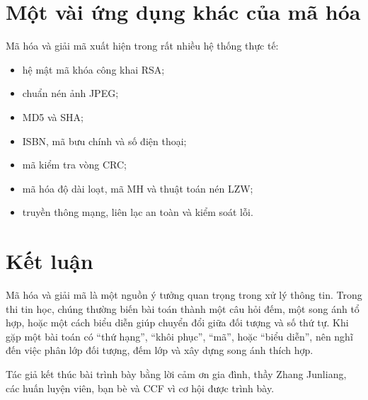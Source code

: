 \documentclass[11pt]{article}
\begin{document}
\section{Một vài ứng dụng khác của mã hóa}

Mã hóa và giải mã xuất hiện trong rất nhiều hệ thống thực tế:
\begin{itemize}
  \item hệ mật mã khóa công khai RSA;
  \item chuẩn nén ảnh JPEG;
  \item MD5 và SHA;
  \item ISBN, mã bưu chính và số điện thoại;
  \item mã kiểm tra vòng CRC;
  \item mã hóa độ dài loạt, mã MH và thuật toán nén LZW;
  \item truyền thông mạng, liên lạc an toàn và kiểm soát lỗi.
\end{itemize}

\section{Kết luận}

Mã hóa và giải mã là một nguồn ý tưởng quan trọng trong xử lý thông tin.
Trong thi tin học, chúng thường biến bài toán thành một câu hỏi đếm, một
song ánh tổ hợp, hoặc một cách biểu diễn giúp chuyển đổi giữa đối tượng và
số thứ tự. Khi gặp một bài toán có ``thứ hạng'', ``khôi phục'', ``mã'', hoặc
``biểu diễn'', nên nghĩ đến việc phân lớp đối tượng, đếm lớp và xây dựng song
ánh thích hợp.

Tác giả kết thúc bài trình bày bằng lời cảm ơn gia đình, thầy Zhang Junliang,
các huấn luyện viên, bạn bè và CCF vì cơ hội được trình bày.
\end{document}
